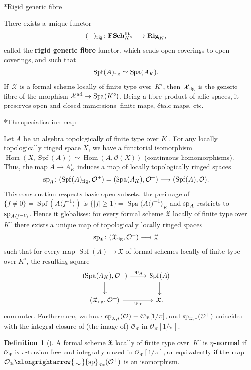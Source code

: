 \documentclass[a4paper,twoside,11pt,reqno]{amsart}
\makeatletter
\newcommand{\cO}{{\mathcal O}}
\newcommand{\cX}{{\mathcal X}}
\newcommand{\fX}{{\mathfrak{X}}}
\newcommand{\isomto}{\xlongrightarrow{\,\smash{\raisebox{-0.65ex} 
    {\ensuremath{\displaystyle\sim}}}\,}}
\DeclareMathOperator{\Hom}{Hom}
\DeclareMathOperator{\Spf}{Spf}
\DeclareMathOperator{\Spa}{Spa}
\newcommand{\cat}[1]{\mathbf{#1}}
\def\subsubsection{\@startsection{subsubsection}{3}%
      \z@{.5\linespacing\@plus.7\linespacing}{-.5em}%
      {\normalfont\bfseries}}
\theoremstyle{definition}
\newtheorem{defi}[thm]{Definition}
\numberwithin{equation}{subsection}
\makeatother
\begin{document}
\subsubsection*{Rigid generic fibre}

There exists a unique functor 
\[
    (-)_{\rm rig} \colon \cat{FSch}^{\rm lft}_{K^\circ} \longrightarrow \cat{Rig}_K,
\]
called the {\bf rigid generic fibre} functor, which sends open coverings to open coverings, and such that 
\[ 
    \Spf(A)_{\rm rig} \simeq \Spa(A_K).
\]
If~$\cX$ is a formal scheme locally of finite type over~$K^\circ$, then~$\cX_{\rm rig}$ is the generic fibre of the morphism $\cX^{\rm ad} \to \Spa (K^\circ)$.
Being a fibre product of adic spaces, it preserves open and closed immersions, finite maps, étale maps, etc.

\subsubsection*{The specialisation map}

Let $A$ be an algebra topologically of finite type over $K^\circ$. For any locally topologically ringed space $X$, we have a functorial isomorphism $\Hom(X, \Spf(A))\simeq \Hom(A, \cO(X))$ (continuous homomorphisms). Thus, the map $A\to A_K^\circ$ induces a map of locally topologically ringed spaces
\[ 
    {\rm sp}_A \colon (\Spf(A)_{\rm rig}, \cO^+) = (\Spa(A_K),  \cO^+) \longrightarrow (\Spf(A), \cO). 
\]
This construction respects basic open subsets: the preimage of $\{f\neq 0\}=\Spf(A\langle f^{-1}\rangle)$ is $\{|f|\geq  1\} = \Spa(A\langle f^{-1}\rangle_K$ and ${\rm sp}_A$ restricts to ${\rm sp}_{A\langle f^{-1}\rangle}$.  Hence it globalises: for every formal scheme $\fX$ locally of finite type over $K^\circ$ there exists a unique map of topologically locally ringed spaces
\[
    {\rm sp}_{\fX} \colon (\fX_{\rm rig}, \cO^+)\longrightarrow \fX
\]
such that for every map $\Spf(A)\to \fX$ of formal schemes locally of finite type over $K^\circ$, the resulting square 
\[ 
    \begin{tikzcd}
        (\Spa(A_K), \cO^+) \ar[d] \ar[r,"{\rm sp}_A"] & \Spf(A) \ar[d] \\
        (\fX_{\rm rig}, \cO^+) \ar[r,"{\rm sp}_\fX",swap] & \fX.
    \end{tikzcd}
\]
commutes.
Furthermore, we have ${\rm sp}_{\fX,*}(\cO) = \cO_\fX[1/\pi]$, and ${\rm sp}_{\fX,*}(\cO^+)$ coincides with the integral closure of (the image of) $\cO_{\fX}$ in $\cO_{\fX}[1/\pi]$.

\begin{defi}[{\cite[Definition~A.1]{AchingerLaraYoucis2022}}] \label{defi:eta-normal}
    A formal scheme $\fX$ locally of finite type over~$K^\circ$ is 
    {\bf \mbox{$\eta$-normal}} if $\cO_{\fX}$ is $\pi$-torsion free and integrally closed in $\cO_{\fX}[1/\pi]$, or equivalently if the map $\cO_\fX \isomto {\rm sp}_{\fX*}(\cO^+)$ is an isomorphism.
\end{defi}
\end{document}
